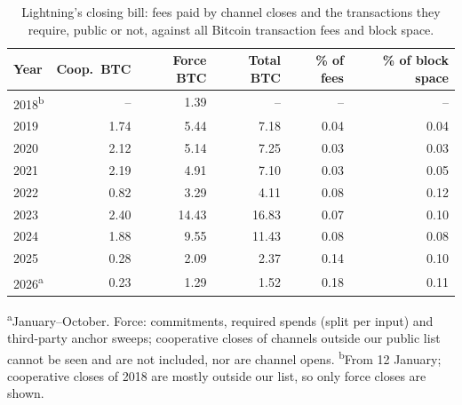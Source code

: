 \begin{table}[t]
\centering
\caption{Lightning's closing bill: fees paid by channel closes and the transactions they require, public or not, against all Bitcoin transaction fees and block space.}
\label{tab:fee_share}
\footnotesize
\begin{tabular}{lrrrrr}
\toprule
Year & Coop.\ BTC & Force BTC & Total BTC & \% of fees & \% of block space \\
\midrule
2018\textsuperscript{b} & -- & 1.39 & -- & -- & -- \\
2019 & 1.74 & 5.44 & 7.18 & 0.04 & 0.04 \\
2020 & 2.12 & 5.14 & 7.25 & 0.03 & 0.03 \\
2021 & 2.19 & 4.91 & 7.10 & 0.03 & 0.05 \\
2022 & 0.82 & 3.29 & 4.11 & 0.08 & 0.12 \\
2023 & 2.40 & 14.43 & 16.83 & 0.07 & 0.10 \\
2024 & 1.88 & 9.55 & 11.43 & 0.08 & 0.08 \\
2025 & 0.28 & 2.09 & 2.37 & 0.14 & 0.10 \\
2026\textsuperscript{a} & 0.23 & 1.29 & 1.52 & 0.18 & 0.11 \\
\bottomrule
\end{tabular}
\par\smallskip\parbox{\linewidth}{\scriptsize \textsuperscript{a}January--October. Force: commitments, required spends (split per input) and third-party anchor sweeps; cooperative closes of channels outside our public list cannot be seen and are not included, nor are channel opens. \textsuperscript{b}From 12 January; cooperative closes of 2018 are mostly outside our list, so only force closes are shown.}
\end{table}
